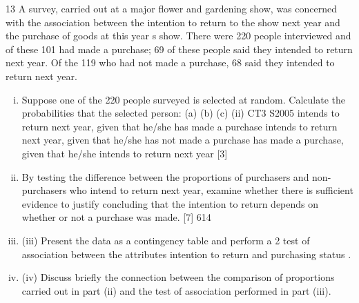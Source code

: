 \documentclass[a4paper,12pt]{article}
\begin{document}
13
A survey, carried out at a major flower and gardening show, was concerned with the association between the intention to return to the show next year and the purchase of goods at this year s show. There were 220 people interviewed and of these 101 had
made a purchase; 69 of these people said they intended to return next year. Of the 119 who had not made a purchase, 68 said they intended to return next year.
\begin{enumerate}[(i)]
\item Suppose one of the 220 people surveyed is selected at random.
Calculate the probabilities that the selected person:
(a)
(b)
(c)
(ii)
CT3 S2005
intends to return next year, given that he/she has made a purchase
intends to return next year, given that he/she has not made a purchase
has made a purchase, given that he/she intends to return next year
[3]
\item By testing the difference between the proportions of purchasers and non-purchasers who intend to return next year, examine whether there is sufficient evidence to justify concluding that the intention to return depends on whether
or not a purchase was made.
[7]
614
\item (iii) Present the data as a contingency table and perform a 2 test of association between the attributes intention to return and purchasing status .
\item
(iv) Discuss briefly the connection between the comparison of proportions carried out in part (ii) and the test of association performed in part (iii).
\end{enumerate}
\end{document}
